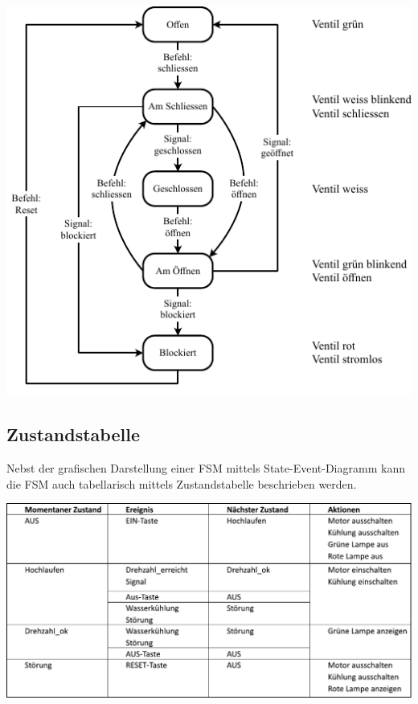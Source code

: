 \begin{center}
    \includegraphics[width=0.8\columnwidth]{images/state_event_example.pdf}
\end{center}


\subsection{Zustandstabelle}

Nebst der grafischen Darstellung einer FSM mittels State-Event-Diagramm kann die FSM auch tabellarisch mittels Zustandstabelle 
beschrieben werden.



\includegraphics[width=\columnwidth]{images/zustandstabelle.pdf}

